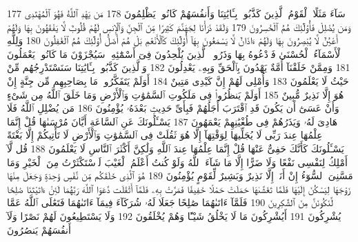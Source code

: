 {\tiny\colorbox{cl_aya}{177}} سَآءَ مَثَلًا ٱلْقَوْمُ ٱلَّذِينَ كَذَّبُوا۟ بِـَٔايَٰتِنَا وَأَنفُسَهُمْ كَانُوا۟ يَظْلِمُونَ
{\tiny\colorbox{cl_aya}{178}} مَن يَهْدِ ٱللَّهُ فَهُوَ ٱلْمُهْتَدِى وَمَن يُضْلِلْ فَأُو۟لَٰٓئِكَ هُمُ ٱلْخَٰسِرُونَ
{\tiny\colorbox{cl_aya}{179}} وَلَقَدْ ذَرَأْنَا لِجَهَنَّمَ كَثِيرًا مِّنَ ٱلْجِنِّ وَٱلْإِنسِ لَهُمْ قُلُوبٌ لَّا يَفْقَهُونَ بِهَا وَلَهُمْ أَعْيُنٌ لَّا يُبْصِرُونَ بِهَا وَلَهُمْ ءَاذَانٌ لَّا يَسْمَعُونَ بِهَآ أُو۟لَٰٓئِكَ كَٱلْأَنْعَٰمِ بَلْ هُمْ أَضَلُّ أُو۟لَٰٓئِكَ هُمُ ٱلْغَٰفِلُونَ
{\tiny\colorbox{cl_aya}{180}} وَلِلَّهِ ٱلْأَسْمَآءُ ٱلْحُسْنَىٰ فَٱدْعُوهُ بِهَا وَذَرُوا۟ ٱلَّذِينَ يُلْحِدُونَ فِىٓ أَسْمَٰٓئِهِۦ سَيُجْزَوْنَ مَا كَانُوا۟ يَعْمَلُونَ
{\tiny\colorbox{cl_aya}{181}} وَمِمَّنْ خَلَقْنَآ أُمَّةٌ يَهْدُونَ بِٱلْحَقِّ وَبِهِۦ يَعْدِلُونَ
{\tiny\colorbox{cl_aya}{182}} وَٱلَّذِينَ كَذَّبُوا۟ بِـَٔايَٰتِنَا سَنَسْتَدْرِجُهُم مِّنْ حَيْثُ لَا يَعْلَمُونَ
{\tiny\colorbox{cl_aya}{183}} وَأُمْلِى لَهُمْ إِنَّ كَيْدِى مَتِينٌ
{\tiny\colorbox{cl_aya}{184}} أَوَلَمْ يَتَفَكَّرُوا۟ مَا بِصَاحِبِهِم مِّن جِنَّةٍ إِنْ هُوَ إِلَّا نَذِيرٌ مُّبِينٌ
{\tiny\colorbox{cl_aya}{185}} أَوَلَمْ يَنظُرُوا۟ فِى مَلَكُوتِ ٱلسَّمَٰوَٰتِ وَٱلْأَرْضِ وَمَا خَلَقَ ٱللَّهُ مِن شَىْءٍ وَأَنْ عَسَىٰٓ أَن يَكُونَ قَدِ ٱقْتَرَبَ أَجَلُهُمْ فَبِأَىِّ حَدِيثٍۭ بَعْدَهُۥ يُؤْمِنُونَ
{\tiny\colorbox{cl_aya}{186}} مَن يُضْلِلِ ٱللَّهُ فَلَا هَادِىَ لَهُۥ وَيَذَرُهُمْ فِى طُغْيَٰنِهِمْ يَعْمَهُونَ
{\tiny\colorbox{cl_aya}{187}} يَسْـَٔلُونَكَ عَنِ ٱلسَّاعَةِ أَيَّانَ مُرْسَىٰهَا قُلْ إِنَّمَا عِلْمُهَا عِندَ رَبِّى لَا يُجَلِّيهَا لِوَقْتِهَآ إِلَّا هُوَ ثَقُلَتْ فِى ٱلسَّمَٰوَٰتِ وَٱلْأَرْضِ لَا تَأْتِيكُمْ إِلَّا بَغْتَةً يَسْـَٔلُونَكَ كَأَنَّكَ حَفِىٌّ عَنْهَا قُلْ إِنَّمَا عِلْمُهَا عِندَ ٱللَّهِ وَلَٰكِنَّ أَكْثَرَ ٱلنَّاسِ لَا يَعْلَمُونَ
{\tiny\colorbox{cl_aya}{188}} قُل لَّآ أَمْلِكُ لِنَفْسِى نَفْعًا وَلَا ضَرًّا إِلَّا مَا شَآءَ ٱللَّهُ وَلَوْ كُنتُ أَعْلَمُ ٱلْغَيْبَ لَٱسْتَكْثَرْتُ مِنَ ٱلْخَيْرِ وَمَا مَسَّنِىَ ٱلسُّوٓءُ إِنْ أَنَا۠ إِلَّا نَذِيرٌ وَبَشِيرٌ لِّقَوْمٍ يُؤْمِنُونَ
{\tiny\colorbox{cl_aya}{189}} هُوَ ٱلَّذِى خَلَقَكُم مِّن نَّفْسٍ وَٰحِدَةٍ وَجَعَلَ مِنْهَا زَوْجَهَا لِيَسْكُنَ إِلَيْهَا فَلَمَّا تَغَشَّىٰهَا حَمَلَتْ حَمْلًا خَفِيفًا فَمَرَّتْ بِهِۦ فَلَمَّآ أَثْقَلَت دَّعَوَا ٱللَّهَ رَبَّهُمَا لَئِنْ ءَاتَيْتَنَا صَٰلِحًا لَّنَكُونَنَّ مِنَ ٱلشَّٰكِرِينَ
{\tiny\colorbox{cl_aya}{190}} فَلَمَّآ ءَاتَىٰهُمَا صَٰلِحًا جَعَلَا لَهُۥ شُرَكَآءَ فِيمَآ ءَاتَىٰهُمَا فَتَعَٰلَى ٱللَّهُ عَمَّا يُشْرِكُونَ
{\tiny\colorbox{cl_aya}{191}} أَيُشْرِكُونَ مَا لَا يَخْلُقُ شَيْـًٔا وَهُمْ يُخْلَقُونَ
{\tiny\colorbox{cl_aya}{192}} وَلَا يَسْتَطِيعُونَ لَهُمْ نَصْرًا وَلَآ أَنفُسَهُمْ يَنصُرُونَ
